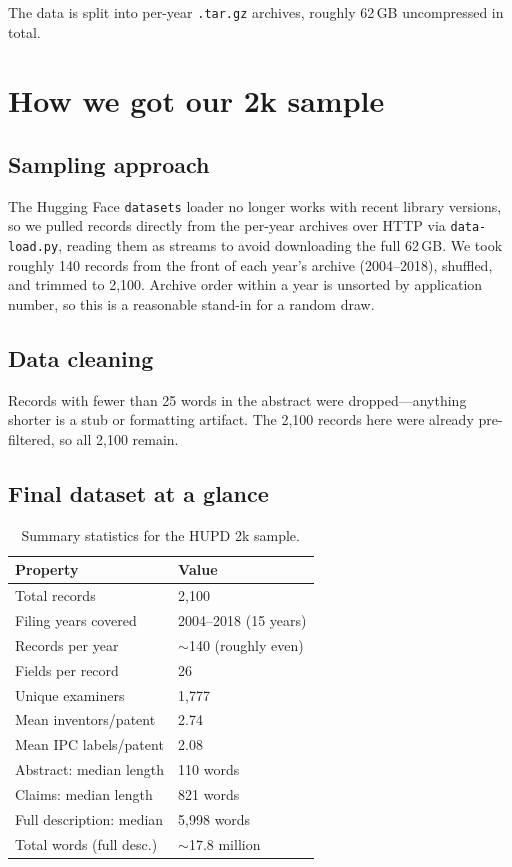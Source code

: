 \documentclass[11pt]{article}
\begin{document}
The data is split into per-year \texttt{.tar.gz} archives, roughly 62\,GB uncompressed in total.

\section{How we got our 2k sample}

\subsection{Sampling approach}

The Hugging Face \texttt{datasets} loader no longer works with recent library versions,
so we pulled records directly from the per-year archives over HTTP via \texttt{data-load.py},
reading them as streams to avoid downloading the full 62\,GB. We took roughly 140 records
from the front of each year's archive (2004--2018), shuffled, and trimmed to 2,100.
Archive order within a year is unsorted by application number, so this is a reasonable
stand-in for a random draw.

\subsection{Data cleaning}

Records with fewer than 25 words in the abstract were dropped---anything shorter is a
stub or formatting artifact. The 2,100 records here were already pre-filtered, so all
2,100 remain.

\subsection{Final dataset at a glance}

\begin{table}[H]
  \centering
  \begin{tabular}{ll}
    \toprule
    \textbf{Property} & \textbf{Value} \\
    \midrule
    Total records           & 2,100 \\
    Filing years covered    & 2004--2018 (15 years) \\
    Records per year        & $\sim$140 (roughly even) \\
    Fields per record       & 26 \\
    Unique examiners        & 1,777 \\
    Mean inventors/patent   & 2.74 \\
    Mean IPC labels/patent  & 2.08 \\
    Abstract: median length & 110 words \\
    Claims: median length   & 821 words \\
    Full description: median & 5,998 words \\
    Total words (full desc.) & $\sim$17.8 million \\
    \bottomrule
  \end{tabular}
  \caption{Summary statistics for the HUPD 2k sample.}
  \label{tab:hupd_summary}
\end{table}
\end{document}
